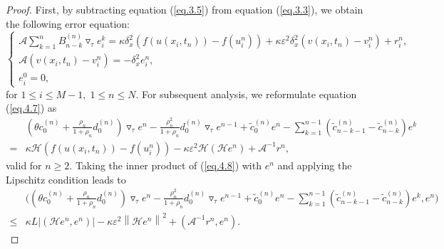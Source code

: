 \documentclass[10pt,a4paper]{amsart}
\begin{document}
\begin{proof}
First, by subtracting equation (\ref{eq.3.5}) from equation
 (\ref{eq.3.3}), we obtain the following error equation:
\begin{equation}\label{eq.4.7}
\begin{cases}
\mathscr{A} \sum\limits_{k=1}^{n}B_{n-k}^{(n)} \triangledown_\tau e_i^k = \kappa \delta_x^2 \left(f(u(x_i,t_n))-f(u_i^n)\right)
+ \kappa \varepsilon^2 \delta_x^2 \left(v(x_i,t_n)- v_i^n\right) + r_{i}^{n}, \\
\mathscr{A} \left(v(x_i,t_n)- v_i^n\right) = -\delta_x^2 e_i^n, \\
e_{i}^{0} = 0,
\end{cases}
\end{equation}
for $1\leq i \leq M-1, \; 1\leq n \leq N$.
For subsequent analysis, we reformulate equation (\ref{eq.4.7}) as
\begin{equation}\label{eq.4.8}
\begin{aligned}
&\left( \theta c_{0}^{(n)}+ \frac{\rho_{n}}{1+\rho_{n}}d_{0}^{(n)} \right) \triangledown_\tau e^{n} - \frac{\rho_{n}^2}{1+\rho_{n}}d_{0}^{(n)} \triangledown_\tau e^{n-1} + \widetilde{c}_{0}^{(n)} e^{n}
- \sum\limits_{k=1}^{n-1} \left( \widetilde{c}_{n-k-1}^{(n)} - \widetilde{c}_{n-k}^{(n)} \right) e^{k} \\
= &\kappa \mathcal{H} \left(f\left(u\left(x_i,t_n\right)\right)
-f\left(u_i^n\right)\right) - \kappa
\varepsilon^2 \mathcal{H} \left(\mathcal{H} e^n\right) + \mathscr{A}^{-1}r^n,
\end{aligned}
\end{equation}
valid for $n \geq 2$.
Taking the inner product of (\ref{eq.4.8}) with $e^n$ and applying the Lipschitz condition leads to
\begin{equation}\label{eq.4.9}
\begin{aligned}
&\Bigg(\left(\theta c_{0}^{(n)} + \frac{\rho_{n}}{1+\rho_{n}}d_{0}^{(n)}\right) \triangledown_\tau e^{n} - \frac{\rho_{n}^2}{1+\rho_{n}}d_{0}^{(n)} \triangledown_\tau e^{n-1}
+ \widetilde{c}_{0}^{(n)} e^{n} - \sum_{k=1}^{n-1} \left(\widetilde{c}_{n-k-1}^{(n)} - \widetilde{c}_{n-k}^{(n)}\right) e^{k}, e^n\Bigg) \\
\leq &\kappa L|\left(\mathcal{H} e^n,e^n\right)| - \kappa \varepsilon^2
\left\|\mathcal{H} e^n\right\|^2 + \left(\mathscr{A}^{-1}r^n, e^n\right).
\end{aligned}
\end{equation}


\end{proof}
\end{document}
